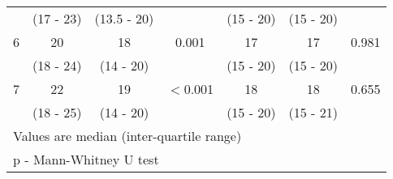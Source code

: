 \begin{table}[b]
\begin{tabular}{| c | c c c | c c c |}
		           & (17 - 23) & (13.5 - 20) &                    & (15 - 20) & (15 - 20) &  \\
		6          & 20        & 18          & 0.001              & 17        & 17        & 0.981                \\
		           & (18 - 24) & (14 - 20)   &                    & (15 - 20) & (15 - 20) &  \\
		7          & 22        & 19          & $<$0.001           & 18        & 18        & 0.655                \\
		           & (18 - 25) & (14 - 20)   &                    & (15 - 20) & (15 - 21) &  \\ \hline
		\multicolumn{7}{l}{Values are median (inter-quartile range)}                                             \\
		\multicolumn{7}{l}{p - Mann-Whitney U test}
	\end{tabular}
\end{table}
